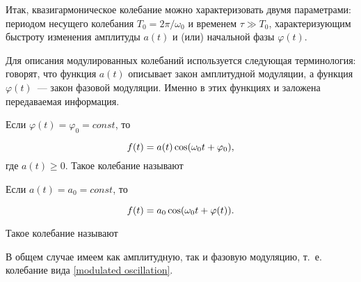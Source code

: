 Итак, квазигармоническое колебание можно характеризовать двумя параметрами: периодом несущего колебания
$T_0=2\pi/\omega_0$ и временем $\tau \gg T_0$, характеризующим быстроту изменения амплитуды $a(t)$ и (или) начальной
фазы $\varphi(t)$.

%
Для описания модулированных колебаний используется
следующая терминология: говорят, что функция $a(t)$ описывает закон амплитудной модуляции, а функция $\varphi(t)$~--- закон
фазовой модуляции. Именно в этих функциях и заложена передаваемая информация.

Если $\varphi(t)=\varphi_0=const$, то

\begin{equation}
	\eqmark{amplitude-modulated}
	f(t)=a(t)\cos(\omega_0t+\varphi_0),
\end{equation}
где $a(t)\ge0$. Такое колебание называют 

Если $a(t)=a_0=const$, то

\begin{equation}
	\eqmark{phase-modulated}
	f(t)=a_0 \cos(\omega_0t+\varphi(t)).
\end{equation}

Такое колебание называют 

В общем случае имеем как амплитудную, так и фазовую модуляцию, т.~е. колебание вида \eqref{modulated oscillation}.




